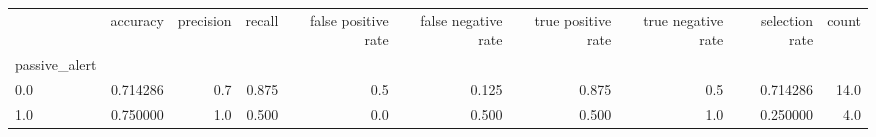\begin{tabular}{lrrrrrrrrr}
\toprule
{} &  accuracy &  precision &  recall &  false positive rate &  false negative rate &  true positive rate &  true negative rate &  selection rate &  count \\
passive\_alert &           &            &         &                      &                      &                     &                     &                 &        \\
\midrule
0.0           &  0.714286 &        0.7 &   0.875 &                  0.5 &                0.125 &               0.875 &                 0.5 &        0.714286 &   14.0 \\
1.0           &  0.750000 &        1.0 &   0.500 &                  0.0 &                0.500 &               0.500 &                 1.0 &        0.250000 &    4.0 \\
\bottomrule
\end{tabular}
